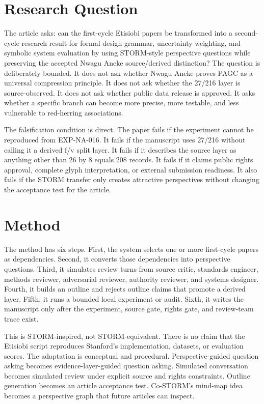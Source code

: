 \documentclass[sigconf,nonacm]{acmart}
\begin{document}
\section{Research Question}
The article asks: can the first-cycle Etisiobi papers be transformed into a
second-cycle research result for formal design grammar, uncertainty weighting, and symbolic system evaluation by using STORM-style perspective
questions while preserving the accepted Nwagu Aneke source/derived distinction?
The question is deliberately bounded. It does not ask whether Nwagu Aneke proves
PAGC as a universal compression principle. It does not ask whether the 27/216
layer is source-observed. It does not ask whether public data release is
approved. It asks whether a specific branch can become more precise, more
testable, and less vulnerable to red-herring associations.

The falsification condition is direct. The paper fails if the experiment cannot
be reproduced from EXP-NA-016. It fails if the manuscript uses 27/216 without
calling it a derived f/v split layer. It fails if it describes the source layer
as anything other than 26 by 8 equals 208 records. It fails if it claims public
rights approval, complete glyph interpretation, or external submission readiness.
It also fails if the STORM transfer only creates attractive perspectives without
changing the acceptance test for the article.

\section{Method}
The method has six steps. First, the system selects one or more first-cycle
papers as dependencies. Second, it converts those dependencies into perspective
questions. Third, it simulates review turns from source critic, standards
engineer, methods reviewer, adversarial reviewer, authority reviewer, and
systems designer. Fourth, it builds an outline and rejects outline claims that
promote a derived layer. Fifth, it runs a bounded local experiment or audit.
Sixth, it writes the manuscript only after the experiment, source gate, rights
gate, and review-team trace exist.

This is STORM-inspired, not STORM-equivalent. There is no claim that the
Etisiobi script reproduces Stanford's implementation, datasets, or evaluation
scores. The adaptation is conceptual and procedural. Perspective-guided question
asking becomes evidence-layer-guided question asking. Simulated conversation
becomes simulated review under explicit source and rights constraints. Outline
generation becomes an article acceptance test. Co-STORM's mind-map idea becomes
a perspective graph that future articles can inspect.
\end{document}
